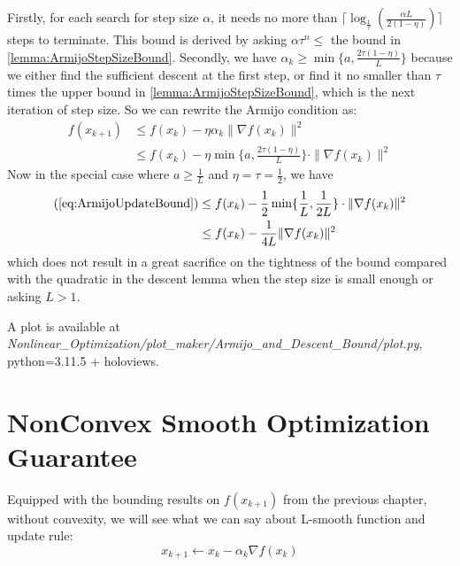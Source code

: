 \begin{note}
    Firstly, for each search for step size $\alpha$, it needs no more than $\lceil \log_{\frac{1}{\tau}} (\frac{\alpha L}{2(1-\eta)}) \rceil $ steps to terminate. This bound is derived by asking $\alpha \tau^n \leq $ the bound in \ref{lemma:ArmijoStepSizeBound}. Secondly, we have $\alpha_k \geq \min\{ a, \frac{2\tau(1 - \eta)}{L} \}$ because we either find the sufficient descent at the first step, or find it no smaller than $\tau$ times the upper bound in \ref{lemma:ArmijoStepSizeBound}, which is the next iteration of step size. So we can rewrite the Armijo condition as:
    \begin{align}
        f(x_{k+1}) &\leq f(x_k) - \eta \alpha_k\|\nabla f(x_k) \|^2 \\
        &\leq f(x_k) - \eta \min\{ a, \frac{2\tau(1-\eta)}{L} \} \cdot \|\nabla f(x_k) \|^2  \label{eq:ArmijoUpdateBound}
    \end{align}
    Now in the special case where $a \geq \frac{1}{L}$ and $\eta = \tau = \frac{1}{2}$, we have 
    \begin{align*}
        (\ref{eq:ArmijoUpdateBound}) &\leq f(x_k) - \frac{1}{2}\min\{\frac{1}{L}, \frac{1}{2L}\} \cdot \|\nabla f(x_k) \|^2 \\
        &\leq f(x_k) - \frac{1}{4L}\| \nabla f(x_k) \|^2
    \end{align*}
    which does not result in a great sacrifice on the tightness of the bound compared with the quadratic in the descent lemma when the step size is small enough or asking $L > 1$. 
    
    A plot is available at \emph{Nonlinear\_Optimization/plot\_maker/Armijo\_and\_Descent\_Bound/plot.py}, python=3.11.5 + holoviews.
\end{note}

\section{NonConvex Smooth Optimization Guarantee}
Equipped with the bounding results on $f(x_{k+1})$ from the previous chapter, without convexity, we will see what we can say about L-smooth function and update rule:
\begin{equation*}
    x_{k+1} \leftarrow x_k - \alpha_k \nabla f(x_k)
\end{equation*}

